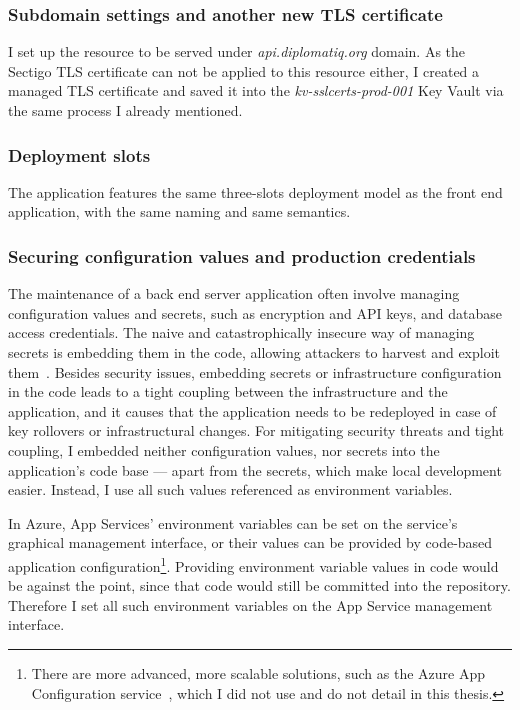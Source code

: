 \subsubsection{Subdomain settings and another new TLS certificate}

I set up the resource to be served under \emph{api.diplomatiq.org} domain. As the Sectigo TLS certificate can not be applied to this resource either, I created a managed TLS certificate and saved it into the \emph{kv-sslcerts-prod-001} Key Vault via the same process I already mentioned.

\subsubsection{Deployment slots}

The application features the same three-slots deployment model as the front end application, with the same naming and same semantics.

\subsubsection{Securing configuration values and production credentials}

The maintenance of a back end server application often involve managing configuration values and secrets, such as encryption and API keys, and database access credentials. The naive and catastrophically insecure way of managing secrets is embedding them in the code, allowing attackers to harvest and exploit them~\cite{secretsinsourcecodes, meli2019bad}. Besides security issues, embedding secrets or infrastructure configuration in the code leads to a tight coupling between the infrastructure and the application, and it causes that the application needs to be redeployed in case of key rollovers or infrastructural changes. For mitigating security threats and tight coupling, I embedded neither configuration values, nor secrets into the application's code base — apart from the  secrets, which make local development easier. Instead, I use all such values referenced as environment variables.

In Azure, App Services' environment variables can be set on the service's graphical management interface, or their values can be provided by code-based application configuration\footnote{There are more advanced, more scalable solutions, such as the Azure App Configuration service~\cite{azure-app-config}, which I did not use and do not detail in this thesis.}. Providing environment variable values in code would be against the point, since that code would still be committed into the repository. Therefore I set all such environment variables on the App Service management interface.

